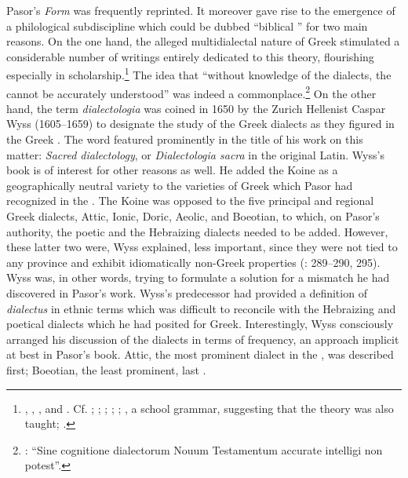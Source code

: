 Pasor’s \textit{Form} was frequently reprinted. It moreover gave rise to the emergence of a philological subdiscipline which could be dubbed “biblical ” for two main reasons. On the one hand, the alleged multidialectal nature of  Greek stimulated a considerable number of writings entirely dedicated to this theory, flourishing especially in  scholarship.\footnote{\citet{Wyss1650}, \citet{Olearius1668}, \citet{Leusden1670}, and \citet{Nibbe1755}. Cf. \citet[347]{Parr1686}; \citet[18--19]{Von1705}; \citet[9--10]{Florinus1707}; \citet[\textsc{d.2}\textsc{\textsuperscript{r}}, \textsc{d.5}\textsc{\textsuperscript{v}}]{Thryllitsch1709}; \citet[18]{Reinhard1724}; \citet[121--122]{Holmes1735}, a school grammar, suggesting that the theory was also taught; \citet[136--137]{Walch1772}.} The idea that “without knowledge of the dialects, the  cannot be accurately understood” was indeed a commonplace.\footnote{\citet[\textsc{d.5}\textsc{\textsuperscript{v}}]{Thryllitsch1709}: “Sine cognitione dialectorum Nouum Testamentum accurate intelligi non potest”.} On the other hand, the term \textit{dialectologia} was coined in 1650 by the Zurich Hellenist Caspar Wyss (1605–1659) to designate the study of the Greek dialects as they figured in the Greek . The word featured prominently in the title of his work on this matter: \textit{Sacred dialectology}, or \textit{Dialectologia sacra} in the original Latin. Wyss’s book is of interest for other reasons as well. He added the Koine as a geographically neutral variety to the varieties of Greek which Pasor had recognized in the  \citep[3]{Wyss1650}. The Koine was opposed to the five principal and regional Greek dialects, Attic, Ionic, Doric, Aeolic, and Boeotian, to which, on Pasor’s authority, the poetic and the Hebraizing dialects needed to be added. However, these latter two were, Wyss explained, less important, since they were not tied to any province and exhibit idiomatically non-Greek properties (\citealt{Wyss1650}: 289–290, 295). Wyss was, in other words, trying to formulate a solution for a mismatch he had discovered in Pasor’s work. Wyss’s predecessor had provided a definition of \textit{dialectus} in ethnic terms which was difficult to reconcile with the Hebraizing and poetical dialects which he had posited for  Greek. Interestingly, Wyss consciously arranged his discussion of the  dialects in terms of frequency, an approach implicit at best in Pasor’s book. Attic, the most prominent dialect in the , was described first; Boeotian, the least prominent, last \citep[4]{Wyss1650}.

